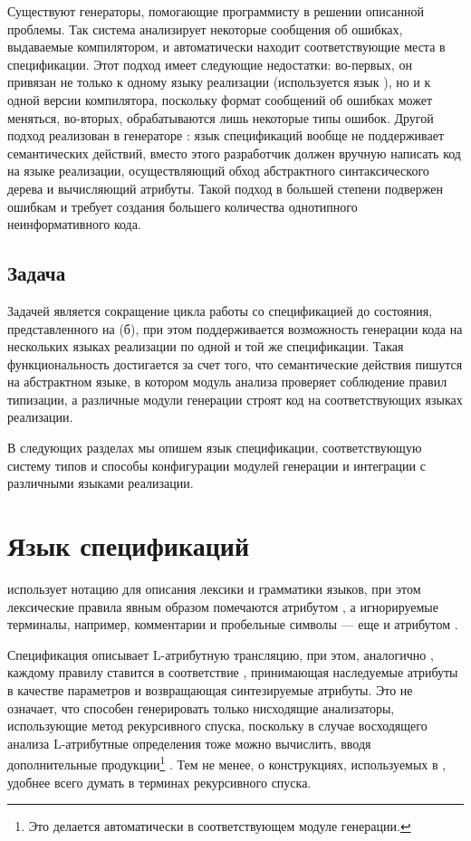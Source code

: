 Существуют генераторы, помогающие программисту в решении описанной проблемы. Так система  \cite{???} анализирует некоторые сообщения об ошибках, выдаваемые компилятором, и автоматически находит соответствующие места в спецификации. Этот подход имеет следующие недостатки: во-первых, он привязан не только к одному языку реализации (используется язык ), но и к одной версии компилятора, поскольку формат сообщений об ошибках может меняться, во-вторых, обрабатываются лишь некоторые типы ошибок. Другой подход реализован в генераторе  \cite{???}: язык спецификаций вообще не поддерживает семантических действий, вместо этого разработчик должен вручную написать код на языке реализации, осуществляющий обход абстрактного синтаксического дерева и вычисляющий атрибуты. Такой подход в большей степени подвержен ошибкам и требует создания большего количества однотипного неинформативного кода.

\section{Задача \ATF{}}

Задачей \ATF{} является сокращение цикла работы со спецификацией до состояния, представленного на  (б), при этом поддерживается возможность генерации кода на нескольких языках реализации по одной и той же спецификации.
Такая функциональность достигается за счет того, что семантические действия пишутся на абстрактном языке, в котором модуль анализа проверяет соблюдение правил типизации, а различные модули генерации строят код на соответствующих языках реализации.

В следующих разделах мы опишем язык спецификации, соответствующую систему типов и способы конфигурации модулей генерации и интеграции с различными языками реализации.

\chapter{Язык спецификаций \ATF{}}

\ATF{} использует нотацию \GRM{} для описания лексики и грамматики языков, при этом лексические правила явным образом помечаются атрибутом , а игнорируемые терминалы, например, комментарии и пробельные символы --- еще и атрибутом .

Спецификация описывает L-атрибутную трансляцию, при этом, аналогично , каждому правилу ставится в соответствие , принимающая наследуемые атрибуты в качестве параметров и возвращающая синтезируемые атрибуты. Это не означает, что \ATF{} способен генерировать только нисходящие анализаторы, использующие метод рекурсивного спуска, поскольку в случае восходящего анализа L-атрибутные определения тоже можно вычислить, вводя дополнительные продукции\footnote{Это делается автоматически в соответствующем модуле генерации.} \cite{???}. Тем не менее, о конструкциях, используемых в \ATF{}, удобнее всего думать в терминах рекурсивного спуска.

